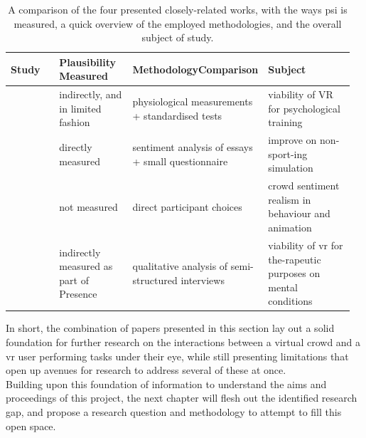 \begin{table}[!h]
\begin{center}
	\begin{tabular}{|p{0.15\linewidth}|p{0.22\linewidth}|p{0.32\linewidth}|p{0.27\linewidth}|} 
	\hline
 	\bf Study  & \bf Plausibility Measured  & \bf Methodology\newline Comparison & \bf Subject \\
  	\hline\hline
	\cite{stinson-2014-feasibility} & indirectly, and in limited fashion & physiological measurements + standardised tests & viability of VR for psychological training \\
	\hline
	\cite{slater-2023-sentiment} & directly measured & sentiment analysis of essays + small questionnaire & improve on non-sport-ing simulation \\
	\hline
	\cite{glemarec-2021-indifferent} & not measured & direct participant choices & crowd sentiment realism in behaviour and animation \\
	\hline
	\cite{riches-2019-factors} & indirectly measured as part of Presence & qualitative analysis of semi-structured interviews & viability of \gls{vr} for the-rapeutic purposes on mental conditions \\
	\hline
	\end{tabular}
\end{center}
\caption[Comparison of Closely-Related Projects]{A comparison of the four presented closely-related works, with the ways \gls{psi} is measured, a quick overview of the employed methodologies, and the overall subject of study.}	
\label{tab:SummaryProjects}
\end{table}

In short, the combination of papers presented in this section lay out a solid foundation for further research on the interactions between a virtual crowd and a \gls{vr} user performing tasks under their eye, while still presenting limitations that open up avenues for research to address several of these at once.\\

Building upon this foundation of information to understand the aims and proceedings of this project, the next chapter will flesh out the identified research gap, and propose a research question and methodology to attempt to fill this open space.
